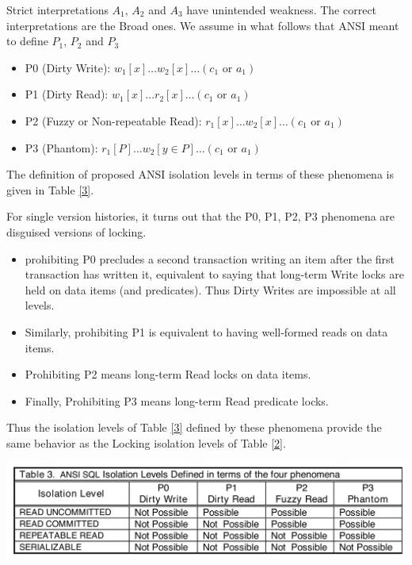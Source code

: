 \documentclass[11pt]{article}
\begin{document}
\begin{remark}[]
Strict interpretations \(A_1\), \(A_2\) and \(A_3\) have unintended weakness. The correct
interpretations are the Broad ones. We assume in what follows that ANSI meant to define \(P_1\),
\(P_2\) and \(P_3\)
\end{remark}

\begin{remark}[]
\begin{itemize}
\item P0 (Dirty Write): \(w_1[x]\dots w_2[x]\dots(c_1\text{ or }a_1)\)
\item P1 (Dirty Read): \(w_1[x]\dots r_2[x]\dots(c_1\text{ or }a_1)\)
\item P2 (Fuzzy or Non-repeatable Read): \(r_1[x]\dots w_2[x]\dots(c_1\text{ or }a_1)\)
\item P3 (Phantom): \(r_1[P]\dots w_2[y\in P]\dots(c_1\text{ or }a_1)\)
\end{itemize}

The definition of proposed ANSI isolation levels in terms of these phenomena is given in Table \ref{3}.

For single version histories, it turns out that the P0, P1, P2, P3 phenomena are disguised versions of
locking.

\begin{itemize}
\item prohibiting P0 precludes a second transaction writing an item after the first transaction has
written it, equivalent to saying that long-term Write locks are held on data items (and predicates). Thus Dirty Writes are impossible at all levels.
\item Similarly, prohibiting P1 is equivalent to having well-formed reads on data items.
\item Prohibiting P2 means long-term Read locks on data items.
\item Finally, Prohibiting P3 means long-term Read predicate locks.
\end{itemize}

Thus the isolation levels of Table \ref{3} defined by these phenomena provide the same behavior as the Locking isolation levels of Table \ref{2}.

\begin{center}
\includegraphics[width=.9\textwidth]{../../images/papers/119.png}
\label{3}
\end{center}
\end{remark}
\end{document}
